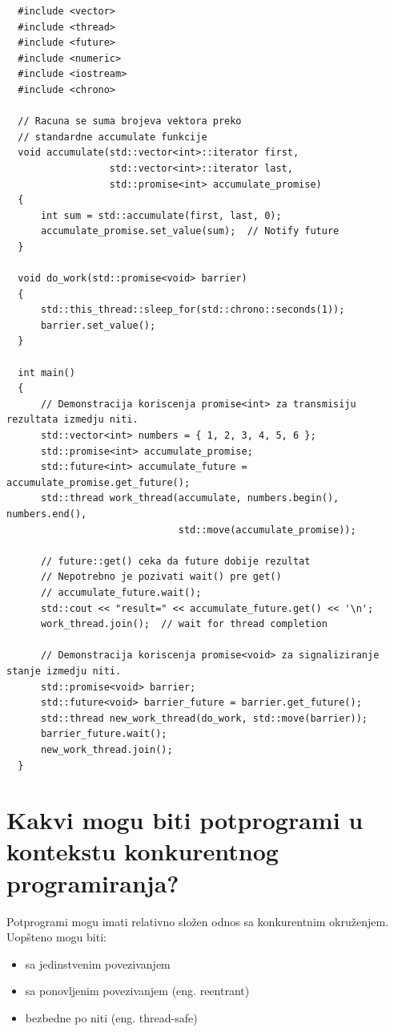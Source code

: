 \documentclass[a4paper]{article}
\begin{document}
\begin{lstlisting}
  #include <vector>
  #include <thread>
  #include <future>
  #include <numeric>
  #include <iostream>
  #include <chrono>
   
  // Racuna se suma brojeva vektora preko
  // standardne accumulate funkcije 
  void accumulate(std::vector<int>::iterator first,
                  std::vector<int>::iterator last,
                  std::promise<int> accumulate_promise)
  {
      int sum = std::accumulate(first, last, 0);
      accumulate_promise.set_value(sum);  // Notify future
  }
   
  void do_work(std::promise<void> barrier)
  {
      std::this_thread::sleep_for(std::chrono::seconds(1));
      barrier.set_value();
  }
   
  int main()
  {
      // Demonstracija koriscenja promise<int> za transmisiju rezultata izmedju niti.
      std::vector<int> numbers = { 1, 2, 3, 4, 5, 6 };
      std::promise<int> accumulate_promise;
      std::future<int> accumulate_future = accumulate_promise.get_future();
      std::thread work_thread(accumulate, numbers.begin(), numbers.end(),
                              std::move(accumulate_promise));
   
      // future::get() ceka da future dobije rezultat
      // Nepotrebno je pozivati wait() pre get() 
      // accumulate_future.wait();  
      std::cout << "result=" << accumulate_future.get() << '\n';
      work_thread.join();  // wait for thread completion
   
      // Demonstracija koriscenja promise<void> za signaliziranje stanje izmedju niti.
      std::promise<void> barrier;
      std::future<void> barrier_future = barrier.get_future();
      std::thread new_work_thread(do_work, std::move(barrier));
      barrier_future.wait();
      new_work_thread.join();
  }\end{lstlisting}

\section{Kakvi mogu biti potprogrami u kontekstu konkurentnog programiranja?}
  Potprogrami mogu imati relativno složen odnos sa konkurentnim okruženjem. Uopšteno mogu biti:
  \begin{itemize}
    \item sa jedinstvenim povezivanjem
    \item sa ponovljenim povezivanjem (eng. reentrant)
    \item bezbedne po niti (eng. thread-safe)
  \end{itemize}
  
\end{document}

